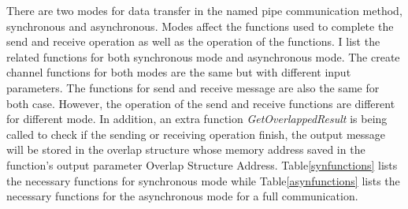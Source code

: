 There are two modes for data transfer in the named pipe communication method, synchronous and asynchronous.  Modes affect the functions used to complete the send and receive operation as well as the operation of the functions. I list the related functions for both synchronous mode and asynchronous mode. The create channel functions for both modes are the same but with different input parameters. The functions for send and receive message are also the same for both case. However, the operation of the send and receive functions are different for different mode. In addition, an extra function \textit{GetOverlappedResult} is being called to check if the sending or receiving operation finish, the output message will be stored in the overlap structure whose memory address saved in the function's output parameter Overlap Structure Address. Table\ref{synfunctions} lists the necessary functions for synchronous mode while Table\ref{asynfunctions} lists the necessary functions for the asynchronous mode for a full communication.

